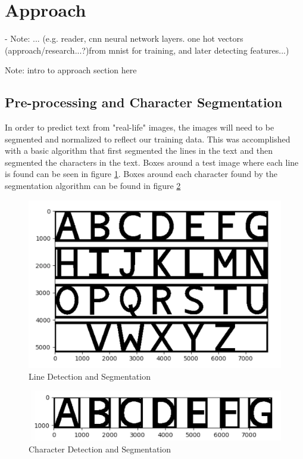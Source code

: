 \documentclass[11pt]{article}
\begin{document}
\section{Approach}
    - Note: ... (e.g. reader, cnn neural network layers.  one hot vectors (approach/research...?)from mnist for training, and later detecting features...)

    Note: intro to approach section here

\subsection{Pre-processing and Character Segmentation}
    
    In order to predict text from "real-life" images, the images will need to be segmented and normalized to reflect our training data. This was accomplished with a basic algorithm that first segmented the lines in the text and then segmented the characters in the text. Boxes around a test image where each line is found can be seen in figure \ref{fig:line_segmentation}. Boxes around each character found by the segmentation algorithm can be found in figure \ref{fig:character_segmentation}
    
    \begin{figure}
        \centering
        \includegraphics[scale=0.4]{line_segmentation_example.png}
        \caption{Line Detection and Segmentation}
        \label{fig:line_segmentation}
    \end{figure}
    
    \begin{figure}
        \centering
        \includegraphics[scale=0.4]{character_segmentation_example.png}
        \caption{Character Detection and Segmentation}
        \label{fig:character_segmentation}
    \end{figure}
\end{document}
